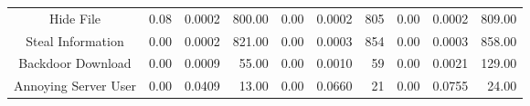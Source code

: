 \begin{table*}[t]
{\begin{tabular}{crrrrrrrrr}
Hide File            & 0.08                                                                      & 0.0002                                                                    & 800.00                                                                    & 0.00                                                                         & 0.0002                                                                   & 805                                                                       & 0.00                                                                      & 0.0002                                                                      & 809.00                                                                    \\ 
Steal Information    & 0.00                                                                      & 0.0002                                                                    & 821.00                                                                    & 0.00                                                                         & 0.0003                                                                   & 854                                                                       & 0.00                                                                      & 0.0003                                                                      & 858.00                                                                    \\ 
Backdoor Download    & 0.00                                                                      & 0.0009                                                                    & 55.00                                                                     & 0.00                                                                         & 0.0010                                                                   & 59                                                                        & 0.00                                                                      & 0.0021                                                                      & 129.00                                                                    \\ 
Annoying Server User & 0.00                                                                      & 0.0409                                                                    & 13.00                                                                     & 0.00                                                                         & 0.0660                                                                   & 21                                                                        & 0.00                                                                      & 0.0755                                                                      & 24.00                                                                     \\ 

\end{tabular}}
\end{table*}
